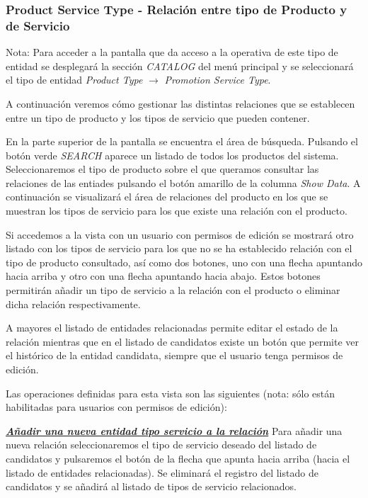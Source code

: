 \subsubsection{Product Service Type - Relación entre tipo de Producto y de Servicio}
\label{sub:product-service-type-relation}

Nota: Para acceder a la pantalla que da acceso a la operativa de este tipo de entidad se desplegará la sección \emph{CATALOG} del menú principal y se seleccionará el tipo de entidad \emph{Product Type} $\rightarrow$  \emph{Promotion Service Type}.


A continuación veremos cómo gestionar las distintas relaciones que se establecen entre un tipo de producto y los tipos de servicio que pueden contener.


En la parte superior de la pantalla se encuentra el área de búsqueda. Pulsando el botón verde \emph{SEARCH} aparece un listado de todos los productos del sistema. Seleccionaremos el tipo de producto sobre el que queramos consultar las relaciones de las entiades pulsando el botón amarillo de la columna \emph{Show Data}. A continuación se visualizará el área de relaciones del producto en los que se muestran los tipos de servicio para los que existe una relación con el producto.

Si accedemos a la vista con un usuario con permisos de edición se mostrará otro listado con los tipos de servicio para los que no se ha establecido relación con el tipo de producto consultado, así como dos botones, uno con una flecha apuntando hacia arriba y otro con una flecha apuntando hacia abajo. Estos botones permitirán añadir un tipo de servicio a la relación con el producto o eliminar dicha relación respectivamente. 

A mayores el listado de entidades relacionadas permite editar el estado de la relación mientras que en el listado de candidatos existe un botón que permite ver el histórico de la entidad candidata, siempre que el usuario tenga permisos de edición.


Las operaciones definidas para esta vista son las siguientes (nota: sólo están habilitadas para usuarios con permisos de edición):

\underline{\textsl{\textbf{Añadir una nueva entidad tipo servicio a la relación}}} \newline
Para añadir una nueva relación seleccionaremos el tipo de servicio deseado del listado de candidatos y pulsaremos el botón de la flecha que apunta hacia arriba (hacia el listado de entidades relacionadas). Se eliminará el registro del listado de candidatos y se añadirá al listado de tipos de servicio relacionados.


